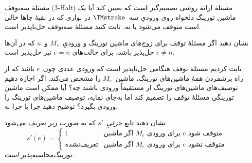 \documentclass[../../../include/open-logic-section]{subfiles}
\begin{document}
\begin{prob}
مسئلهٔ سه‌توقف (3-Halt) مسئلهٔ ارائهٔ روشی تصمیم‌گیر است که تعیین کند
آیا یک ماشین تورینگ دلخواه روی ورودیِ سه~$\TMstroke$ در نواری که در
بقیهٔ جاها خالی است متوقف می‌شود یا نه. ثابت کنید مسئلهٔ سه‌توقف
حل‌ناپذیر است.
\end{prob}

\begin{prob}
نشان دهید اگر مسئلهٔ توقف برای زوج‌های ماشین تورینگ و ورودیِ~$M_e$
و~$n$ که در آن‌ها $e\neq n$ حل‌پذیر باشد، برای حالت‌های $e=n$ نیز
حل‌پذیر است.
\end{prob}

\begin{prob}
ثابت کردیم مسئلهٔ توقف هنگامی حل‌ناپذیر است که ورودی عددی چون~$e$
باشد که از راه برشمردن همهٔ ماشین‌های تورینگ، ماشین~$M_e$ را مشخص
می‌کند. اگر اجازه دهیم توصیف‌های ماشین‌های تورینگ از
 مستقیماً ورودی باشند چه؟ آیا ممکن است ماشین
تورینگی مسئلهٔ توقف را تصمیم کند اما به‌جای نمایه، توصیف ماشین‌های
تورینگ را ورودی بگیرد؟ توضیح دهید چرا یا چرا نه.
\end{prob}

\begin{prob} نشان دهید تابع \emph{جزئیِ}~$s'$ که به صورت زیر تعریف
  می‌شود
  \[
  s'(e)=
  \begin{cases}
    \text{1} & \text{اگر ماشین~$M_e$ برای ورودی~$e$ متوقف شود}\\
    \text{تعریف‌نشده} & \text{اگر ماشین~$M_e$ برای ورودی~$e$ متوقف نشود}
  \end{cases}
  \]
  تورینگ‌محاسبه‌پذیر \emph{است}.
\end{prob}
\end{document}
